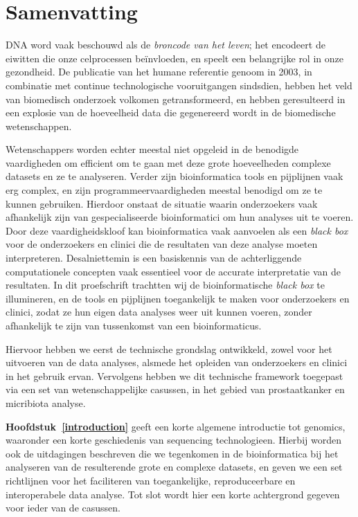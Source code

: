 \chapter{Samenvatting}

DNA word vaak beschouwd als de \emph{broncode van het leven}; het encodeert
de eiwitten die onze celprocessen beïnvloeden, en speelt een belangrijke rol in onze gezondheid.
De publicatie van het humane referentie genoom in 2003, in combinatie met continue technologische vooruitgangen sindsdien, hebben het veld van biomedisch onderzoek volkomen getransformeerd, en hebben geresulteerd in een explosie van de hoeveelheid data die gegenereerd wordt in de biomedische wetenschappen.

Wetenschappers worden echter meestal niet opgeleid in de benodigde vaardigheden om efficient om te gaan met deze grote hoeveelheden complexe datasets en ze te analyseren.
Verder zijn bioinformatica tools en pijplijnen vaak erg complex, en zijn programmeervaardigheden meestal benodigd om ze te kunnen gebruiken. Hierdoor onstaat de situatie waarin onderzoekers vaak afhankelijk zijn van gespecialiseerde bioinformatici om hun analyses uit te voeren.
Door deze vaardigheidskloof kan bioinformatica vaak aanvoelen als een \emph{black box} voor de onderzoekers en clinici die de resultaten van deze analyse moeten interpreteren.
Desalniettemin is een basiskennis van de achterliggende computationele concepten vaak essentieel voor de accurate interpretatie van de resultaten.
In dit proefschrift trachtten wij de bioinformatische \emph{black box} te illumineren, en de tools en pijplijnen toegankelijk te maken voor onderzoekers en clinici, zodat ze hun eigen data analyses weer uit kunnen voeren, zonder afhankelijk te zijn van tussenkomst van een bioinformaticus.

Hiervoor hebben we eerst de technische grondslag ontwikkeld, zowel voor het uitvoeren van de data analyses, alsmede het opleiden van onderzoekers en clinici in het gebruik ervan. Vervolgens hebben we dit technische framework toegepast via een set van wetenschappelijke casussen, in het gebied van prostaatkanker en micribiota analyse.

\textbf{Hoofdstuk~\ref{introduction}} geeft een korte algemene introductie tot genomics, waaronder een korte geschiedenis van sequencing technologieen.
Hierbij worden ook de uitdagingen beschreven die we tegenkomen in de bioinformatica bij het analyseren van de resulterende grote en complexe datasets, en geven we een set richtlijnen voor het faciliteren van toegankelijke, reproduceerbare en interoperabele data analyse.
Tot slot wordt hier een korte achtergrond gegeven voor ieder van de casussen.

